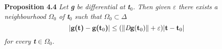 \documentclass{article}
\begin{document}
 \textbf{Proposition 4.4} \emph{Let \emph{\textbf{g}} be differential at \emph{\textbf{t$_0$}}. Then given \emph{$\varepsilon$} there exists a neighbourhood \emph{\textbf{$\Omega$$_0$}} of \emph{\textbf{t$_0$}} such that \emph{\textbf{$\Omega$$_0$}}$\subset$$\Delta$}
 \begin{equation}
 |\textbf{g(t)} - \textbf{g(t$_0$)}|\leq(\|\emph{D}\textbf{g}(\textbf{t$_0$})\| + \varepsilon)|\textbf{t} - \textbf{t$_0$}|
 \end{equation}
 \emph{for every \emph{\textbf{t}$\in$\textbf{$\Omega$$_0$}}.}

\end{document}
